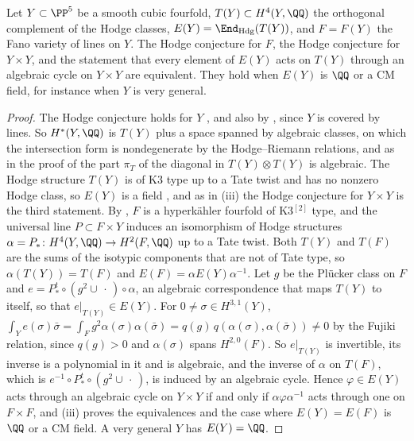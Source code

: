 \begin{corollary}
\label{cor:fanolines}
Let $Y\subset\PP^{5}$ be a smooth cubic fourfold, $T(Y)\subset
H^{4}(Y,\QQ)$ the orthogonal complement of the Hodge classes,
$E(Y)=\End_{\mathrm{Hdg}}(T(Y))$, and $F=F(Y)$ the Fano variety of lines on
$Y$. The Hodge conjecture for $F$, the Hodge conjecture for $Y\times Y$, and
the statement that every element of $E(Y)$ acts on $T(Y)$ through an
algebraic cycle on $Y\times Y$ are equivalent. They hold when $E(Y)$ is $\QQ$
or a CM field, for instance when $Y$ is very general.
\end{corollary}

\begin{proof}
The Hodge conjecture holds for $Y$ \cite{Zuc77}, and also by
, since $Y$ is covered by lines. So $H^{*}(Y,\QQ)$
is $T(Y)$ plus a space spanned by algebraic classes, on which the intersection
form is nondegenerate by the Hodge--Riemann relations, and as in the proof of
 the part $\pi_{T}$ of the diagonal in
$T(Y)\otimes T(Y)$ is algebraic. The Hodge structure $T(Y)$ is of K3 type up
to a Tate twist and has no nonzero Hodge class, so $E(Y)$ is a field
\cite{Zar83}, and as in (iii) the Hodge conjecture for
$Y\times Y$ is the third statement. By \cite{BD85}, $F$ is a hyperk\"ahler
fourfold of K3$^{[2]}$ type, and the universal line $P\subset F\times Y$
induces an isomorphism of Hodge structures $\alpha=P_{*}\colon
H^{4}(Y,\QQ)\to H^{2}(F,\QQ)$ up to a Tate twist. Both $T(Y)$ and $T(F)$
are the sums of the isotypic components that are not of Tate type, so
$\alpha(T(Y))=T(F)$ and $E(F)=\alpha E(Y)\alpha^{-1}$. Let $g$ be the
Pl\"ucker class on $F$ and $e=P^{t}_{*}\circ(g^{2}\cup\,\cdot\,)
\circ\alpha$, an algebraic correspondence that maps $T(Y)$ to itself, so that
$e|_{T(Y)}\in E(Y)$. For $0\ne\sigma\in H^{3,1}(Y)$,
$\int_{Y}e(\sigma)\bar\sigma=\int_{F}g^{2}\alpha(\sigma)\alpha(\bar\sigma)
=q(g)\,q(\alpha(\sigma),\alpha(\bar\sigma))\ne0$ by the Fujiki relation, since
$q(g)>0$ and $\alpha(\sigma)$ spans $H^{2,0}(F)$. So $e|_{T(Y)}$ is
invertible, its inverse is a polynomial in it and is algebraic, and the
inverse of $\alpha$ on $T(F)$,
which is $e^{-1}\circ P^{t}_{*}\circ(g^{2}\cup\,\cdot\,)$, is induced by an
algebraic cycle. Hence $\varphi\in E(Y)$ acts through an algebraic cycle on
$Y\times Y$ if and only if $\alpha\varphi\alpha^{-1}$ acts through one on
$F\times F$, and (iii) proves the equivalences and the
case where $E(Y)=E(F)$ is $\QQ$ or a CM field. A very general $Y$ has
$E(Y)=\QQ$.
\end{proof}

